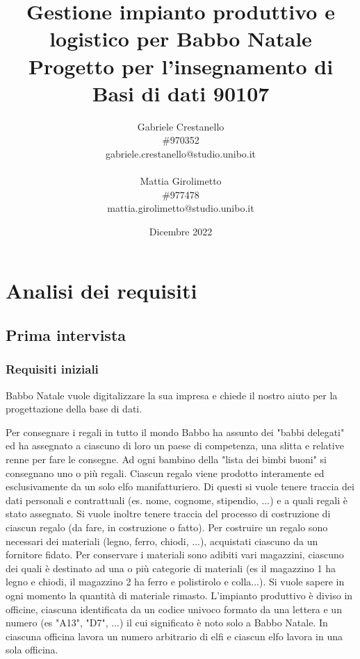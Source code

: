 \documentclass[12pt]{report}
\title{\textbf{Gestione impianto produttivo e logistico per Babbo Natale}\\ [1ex] \large \textbf{Progetto per l'insegnamento di Basi di dati 90107}}
\author{Gabriele Crestanello \\\#970352 \\ gabriele.crestanello@studio.unibo.it\\ \\
Mattia Girolimetto\\ \#977478\\ mattia.girolimetto@studio.unibo.it}
\date{Dicembre 2022}
\begin{document}
\maketitle
\tableofcontents
\chapter{Analisi dei requisiti}
\section{Prima intervista}
\subsection{Requisiti iniziali}

Babbo Natale vuole digitalizzare la sua impresa e chiede il nostro aiuto per la
progettazione della base di dati. 

Per consegnare i regali in tutto il mondo Babbo ha assunto dei "babbi delegati"
ed ha assegnato a ciascuno di loro un paese di competenza, una slitta e relative
renne per fare le consegne. Ad ogni bambino della "lista dei bimbi buoni" si 
consegnano uno o più regali. Ciascun regalo viene prodotto interamente ed 
esclusivamente da un solo elfo manifatturiero. Di questi si vuole tenere traccia 
dei dati personali e contrattuali (es. nome, cognome, stipendio, ...) e a quali 
regali è stato assegnato. 
Si vuole inoltre tenere traccia del processo di costruzione di ciascun regalo
(da fare, in costruzione o fatto). Per costruire un regalo sono necessari 
dei materiali (legno, ferro, chiodi, ...), acquistati ciascuno da un fornitore
fidato. Per conservare i materiali sono adibiti vari magazzini, ciascuno dei
quali è destinato ad una o più categorie di materiali (es il magazzino 1 ha 
legno e chiodi, il magazzino 2 ha ferro e polistirolo e colla...). Si vuole 
sapere in ogni momento la quantità di materiale rimasto.
L'impianto produttivo è diviso in officine, ciascuna identificata da un 
codice univoco formato da una lettera e un numero (es "A13", "D7", ...) il cui
significato è noto solo a Babbo Natale. In ciascuna officina lavora un numero
arbitrario di elfi e ciascun elfo lavora in una sola officina.
\end{document}
